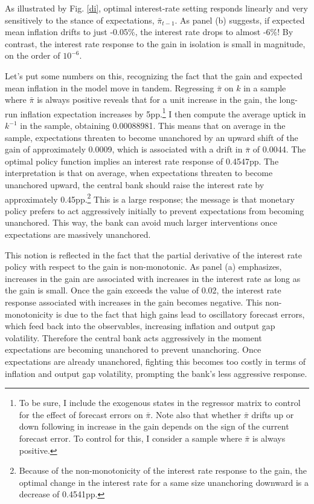 \documentclass[11pt]{article}
\renewcommand{\[}{\begin{equation}}
\renewcommand{\]}{\end{equation}}
\begin{document}
As illustrated by Fig. \ref{di}, optimal interest-rate setting responds linearly and very sensitively to the stance of expectations, $\bar{\pi}_{t-1}$. As panel (b) suggests, if expected mean inflation drifts to just -0.05\%, the interest rate drops to almost -6\%! By contrast, the interest rate response to the gain in isolation is small in magnitude, on the order of $10^{-6}$. 

Let's put some numbers on this, recognizing the fact that the gain and expected mean inflation in the model move in tandem. Regressing $\bar{\pi}$ on $k$ in a sample where $\bar{\pi}$ is always positive reveals that for a unit increase in the gain, the long-run inflation expectation increases by 5pp.\footnote{To be sure, I include the exogenous states in the regressor matrix to control for the effect of forecast errors on $\bar{\pi}$. Note also that whether $\bar{\pi}$ drifts up or down following in increase in the gain depends on the sign of the current forecast error. To control for this, I consider a sample where $\bar{\pi}$ is always positive.} I then compute the average uptick in $k^{-1}$ in the sample, obtaining 0.00088981. This means that on average in the sample, expectations threaten to become unanchored by an upward shift of the gain of approximately 0.0009, which is associated with a drift in $\bar{\pi}$ of 0.0044. The optimal policy function implies an interest rate response of 0.4547pp. The interpretation is that on average, when expectations threaten to become unanchored upward, the central bank should raise the interest rate by approximately 0.45pp.\footnote{Because of the non-monotonicity of the interest rate response to the gain, the optimal change in the interest rate for a same size unanchoring downward is a decrease of 0.4541pp.} This is a large response; the message is that monetary policy prefers to act aggressively initially to prevent expectations from becoming unanchored. This way, the bank can avoid much larger interventions once expectations are massively unanchored. 

This notion is reflected in the fact that the partial derivative of the interest rate policy with respect to the gain is non-monotonic. As panel (a) emphasizes, increases in the gain are associated with increases in the interest rate as long as the gain is small. Once the gain exceeds the value of 0.02, the interest rate response associated with increases in the gain becomes negative. This non-monotonicity is due to the fact that high gains lead to oscillatory forecast errors, which feed back into the observables, increasing inflation and output gap volatility. Therefore the central bank acts aggressively in the moment expectations are becoming unanchored to prevent unanchoring. Once expectations are already unanchored, fighting this becomes too costly in terms of inflation and output gap volatility, prompting the bank's less aggressive response. 
\end{document}
